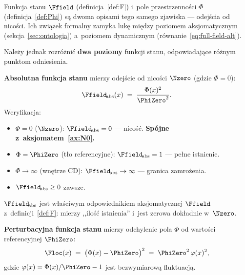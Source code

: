 Funkcja stanu $\Ffield$ (definicja~\ref{def:F}) i~pole
przestrzenno\'sci $\Phi$ (definicja~\ref{def:Phi}) s\k{a}
dwoma opisami tego samego zjawiska --- odej\'scia od nico\'sci.
Ich zwi\k{a}zek formalny zamyka luk\k{e} mi\k{e}dzy
poziomem aksjomatycznym (sekcja~\ref{sec:ontologia}) a~poziomem
dynamicznym (r\'ownanie~\ref{eq:full-field-alt}).

Nale\.zy jednak rozr\'o\.zni\'c \textbf{dwa poziomy} funkcji
stanu, odpowiadaj\k{a}ce r\'o\.znym punktom odniesienia.

\begin{definition}\label{def:Fabs}
\textbf{Absolutna funkcja stanu} mierzy odej\'scie od nico\'sci
$\Nzero$ (gdzie $\Phi = 0$):
\begin{equation}\label{eq:Fabs-def}
    \Ffield_{\!\mathrm{abs}}(x) \;=\; \frac{\Phi(x)^2}{\PhiZero^2}.
\end{equation}
Weryfikacja:
\begin{itemize}[nosep]
  \item $\Phi = 0$ ($\Nzero$):
    $\Ffield_{\!\mathrm{abs}} = 0$ --- nico\'s\'c.
    \textbf{Sp\'ojne z~aksjomatem~\ref{ax:N0}.} \checkmark
  \item $\Phi = \PhiZero$ (t\l{}o referencyjne):
    $\Ffield_{\!\mathrm{abs}} = 1$ --- pe\l{}ne istnienie. \checkmark
  \item $\Phi \to \infty$ (wnętrze CD):
    $\Ffield_{\!\mathrm{abs}} \to \infty$ --- granica
    zamro\.zenia. \checkmark
  \item $\Ffield_{\!\mathrm{abs}} \geq 0$ zawsze. \checkmark
\end{itemize}
$\Ffield_{\!\mathrm{abs}}$ jest w\l{}a\'sciwym odpowiednikiem
aksjomatycznej $\Ffield$ z~definicji~\ref{def:F}: mierzy ,,ilo\'s\'c
istnienia'' i~jest zerowa dok\l{}adnie w~$\Nzero$.
\end{definition}

\begin{definition}\label{def:Floc}
\textbf{Perturbacyjna funkcja stanu} mierzy
odchylenie pola $\Phi$ od warto\'sci referencyjnej $\PhiZero$:
\begin{equation}\label{eq:Floc-def}
    \Floc(x) \;=\; \bigl(\Phi(x) - \PhiZero\bigr)^2
    \;=\; \PhiZero^2\,\varphi(x)^2,
\end{equation}
gdzie $\varphi(x) = \Phi(x)/\PhiZero - 1$ jest
bezwymiarow\k{a} fluktuacj\k{a}.
\end{definition}


